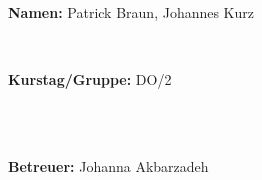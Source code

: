 \documentclass[12pt,a4paper]{article}
\begin{document}
\begin{verbatim}
\end{verbatim}
		\begin{flushleft}
			\textbf{\Large{Namen:}} \Large{Patrick Braun, Johannes Kurz}
			\end{flushleft}

\begin{verbatim}


\end{verbatim}
			\begin{flushleft}
			\textbf{\Large{Kurstag/Gruppe:}} \Large{DO/2}
			\end{flushleft}

\begin{verbatim}



\end{verbatim}
			\begin{flushleft}
			\LARGE{\textbf{Betreuer:}}	\Large{ Johanna Akbarzadeh }	
			\end{flushleft}
\end{document}
